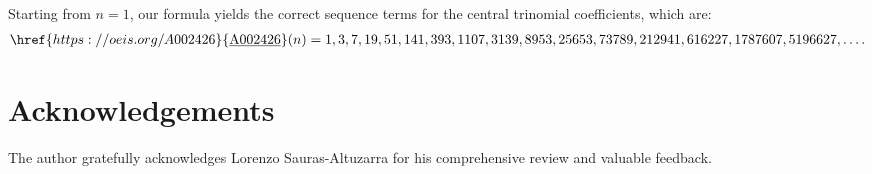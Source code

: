\documentclass[10pt,a4paper]{article}
\theoremstyle{plain}
\newcommand{\seqnum}[1]{\href{https://oeis.org/#1}{\rm \underline{#1}}}
\begin{document}
Starting from $n=1$, our formula yields the correct sequence terms for the central trinomial coefficients, which are:
\begin{align*}
\seqnum{A002426}(n) = 1,3,7,19,51,141,393,1107,3139,8953,25653,73789,212941,616227,1787607,5196627, \ldots .
\end{align*}

\section{Acknowledgements}
The author gratefully acknowledges Lorenzo Sauras-Altuzarra for his comprehensive review and valuable feedback.

\footnotesize
\setlength{\parskip}{0.0em}
\baselineskip=0.0in
\setlength{\parindent}{0pt}
\begingroup
\raggedright


\endgroup
\end{document}
